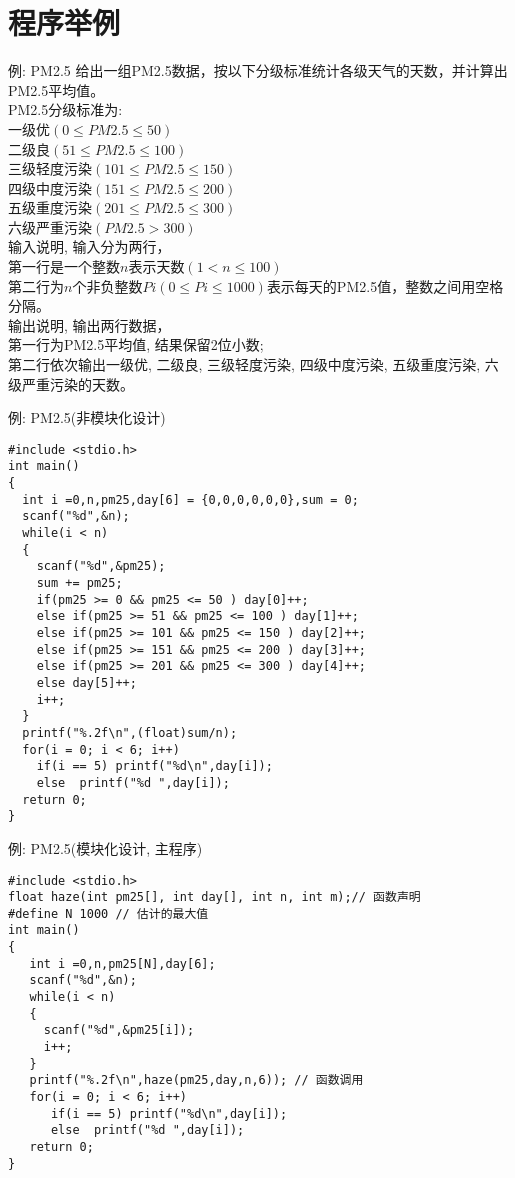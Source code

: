 \section{程序举例}

\begin{frame}{例: PM2.5}
给出一组PM2.5数据，按以下分级标准统计各级天气的天数，并计算出PM2.5平均值。\\ 
PM2.5分级标准为:\\ 
一级优$(0\le PM2.5\le 50)$\\ 
二级良$(51\le PM2.5\le 100)$\\  
三级轻度污染$(101\le PM2.5\le 150)$\\ 
四级中度污染$(151\le PM2.5\le 200)$\\  
五级重度污染$(201\le PM2.5\le 300)$\\ 
六级严重污染$(PM2.5>300)$\\  

输入说明, 输入分为两行，\\ 
第一行是一个整数$n$表示天数$(1<n\le 100)$ \\
第二行为$n$个非负整数$Pi(0\le Pi\le 1000)$表示每天的PM2.5值，整数之间用空格分隔。\\
输出说明, 输出两行数据，\\ 
第一行为PM2.5平均值, 结果保留2位小数;\\ 
第二行依次输出一级优, 二级良, 三级轻度污染, 四级中度污染, 五级重度污染, 六级严重污染的天数。
\end{frame}

\begin{frame}{例: PM2.5(非模块化设计)}
\vspace{-0.2cm}
\begin{lstlisting}
#include <stdio.h>
int main()
{
  int i =0,n,pm25,day[6] = {0,0,0,0,0,0},sum = 0;
  scanf("%d",&n);
  while(i < n) 
  {
    scanf("%d",&pm25);
    sum += pm25;
    if(pm25 >= 0 && pm25 <= 50 ) day[0]++;
    else if(pm25 >= 51 && pm25 <= 100 ) day[1]++;
    else if(pm25 >= 101 && pm25 <= 150 ) day[2]++;
    else if(pm25 >= 151 && pm25 <= 200 ) day[3]++;
    else if(pm25 >= 201 && pm25 <= 300 ) day[4]++;
    else day[5]++;
    i++;
  } 
  printf("%.2f\n",(float)sum/n);
  for(i = 0; i < 6; i++)
    if(i == 5) printf("%d\n",day[i]);
    else  printf("%d ",day[i]);
  return 0;
} 
\end{lstlisting}
\end{frame}

\begin{frame}{例: PM2.5(模块化设计, 主程序)}
\vspace{-0.2cm}
\begin{lstlisting}
#include <stdio.h>
float haze(int pm25[], int day[], int n, int m);// 函数声明
#define N 1000 // 估计的最大值
int main()
{
   int i =0,n,pm25[N],day[6];
   scanf("%d",&n);
   while(i < n) 
   {
     scanf("%d",&pm25[i]);
     i++;
   } 
   printf("%.2f\n",haze(pm25,day,n,6)); // 函数调用
   for(i = 0; i < 6; i++)
      if(i == 5) printf("%d\n",day[i]);
      else  printf("%d ",day[i]);
   return 0;
} 
\end{lstlisting}
\end{frame}

